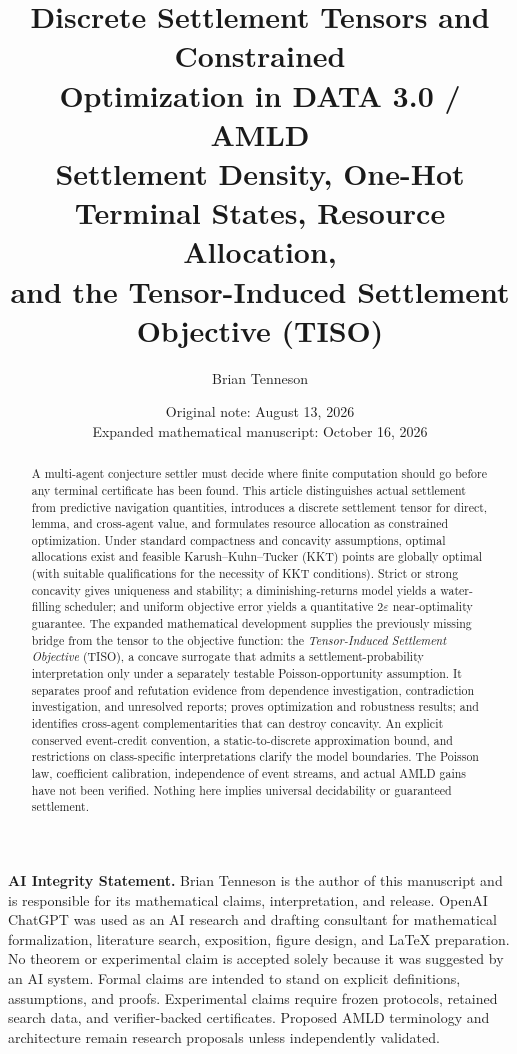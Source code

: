 \documentclass[11pt]{article}
\title{\textbf{Discrete Settlement Tensors and Constrained\\Optimization in DATA 3.0 / AMLD}\\
\large Settlement Density, One-Hot Terminal States, Resource Allocation,\\and the Tensor-Induced Settlement Objective (TISO)}
\author{Brian Tenneson}
\date{Original note: August 13, 2026\\Expanded mathematical manuscript: October 16, 2026}
\begin{document}
\maketitle
\begin{abstract}
A multi-agent conjecture settler must decide where finite computation should go before any terminal certificate has been found. This article distinguishes actual settlement from predictive navigation quantities, introduces a discrete settlement tensor for direct, lemma, and cross-agent value, and formulates resource allocation as constrained optimization. Under standard compactness and concavity assumptions, optimal allocations exist and feasible Karush--Kuhn--Tucker (KKT) points are globally optimal (with suitable qualifications for the necessity of KKT conditions). Strict or strong concavity gives uniqueness and stability; a diminishing-returns model yields a water-filling scheduler; and uniform objective error yields a quantitative $2\varepsilon$ near-optimality guarantee. The expanded mathematical development supplies the previously missing bridge from the tensor to the objective function: the \emph{Tensor-Induced Settlement Objective} (TISO), a concave surrogate that admits a settlement-probability interpretation only under a separately testable Poisson-opportunity assumption. It separates proof and refutation evidence from dependence investigation, contradiction investigation, and unresolved reports; proves optimization and robustness results; and identifies cross-agent complementarities that can destroy concavity. An explicit conserved event-credit convention, a static-to-discrete approximation bound, and restrictions on class-specific interpretations clarify the model boundaries. The Poisson law, coefficient calibration, independence of event streams, and actual AMLD gains have not been verified. Nothing here implies universal decidability or guaranteed settlement.
\end{abstract}

\noindent\textbf{AI Integrity Statement.} Brian Tenneson is the author of this manuscript and is responsible for its mathematical claims, interpretation, and release. OpenAI ChatGPT was used as an AI research and drafting consultant for mathematical formalization, literature search, exposition, figure design, and LaTeX preparation. No theorem or experimental claim is accepted solely because it was suggested by an AI system. Formal claims are intended to stand on explicit definitions, assumptions, and proofs. Experimental claims require frozen protocols, retained search data, and verifier-backed certificates. Proposed AMLD terminology and architecture remain research proposals unless independently validated.
\end{document}

